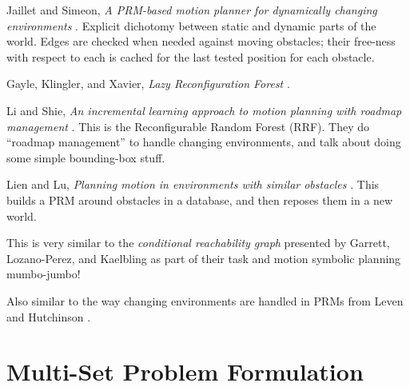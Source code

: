 Jaillet and Simeon,
\emph{A PRM-based motion planner for dynamically changing environments}
\cite{jaillet2004dynamicprm}.
Explicit dichotomy between static and dynamic parts of the world.
Edges are checked when needed against moving obstacles;
their free-ness with respect to each is cached for the last tested position
for each obstacle.

Gayle, Klingler, and Xavier,
\emph{Lazy Reconfiguration Forest}
\cite{gayle2007lazyreconfigforest}.

Li and Shie,
\emph{An incremental learning approach to motion planning with
      roadmap management}
\cite{li2002incrementalprmmanagement}.
This is the Reconfigurable Random Forest (RRF).
They do ``roadmap management'' to handle changing environments,
and talk about doing some simple bounding-box stuff.

Lien and Lu,
\emph{Planning motion in environments with similar obstacles}
\cite{lien2009similarobstacles}.
This builds a PRM around obstacles in a database,
and then reposes them in a new world.

This is very similar to the \emph{conditional reachability graph}
presented by Garrett, Lozano-Perez, and Kaelbling
\cite{garrett2014ffrob}
as part of their task and motion symbolic planning mumbo-jumbo!

Also similar to the way changing environments are handled in PRMs
from Leven and Hutchinson \cite{leven2002changing}.

\section{Multi-Set Problem Formulation}
\label{sec:multi-set}

